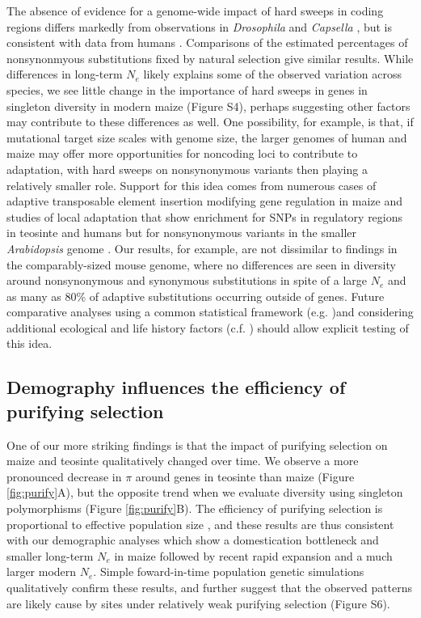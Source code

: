 \documentclass[12pt,a4paper]{article}
\begin{document}
The absence of evidence for a genome-wide impact of hard sweeps in coding regions differs markedly from observations in \emph{Drosophila} \cite{sattath2011} and \emph{Capsella} \cite{williamson2014}, but is consistent with data from humans \cite{hernandez2011}.
Comparisons of the estimated percentages of nonsynonmyous substitutions fixed by natural selection \cite{ross2009,sella2009,eyre2009estimating,williamson2014} give similar results. 
While differences in long-term $N_e$ likely explains some of the observed variation across species, we see little change in the importance of hard sweeps in genes in singleton diversity in modern maize (Figure S4), perhaps suggesting other factors may contribute to these differences as well.  
One possibility, for example, is that, if mutational target size scales with genome size, the larger genomes of human and maize may offer more opportunities for noncoding loci to contribute to adaptation, with hard sweeps on nonsynonymous variants then playing a relatively smaller role. 
Support for this idea comes from numerous cases of adaptive transposable element insertion modifying gene regulation in maize \cite{studer2011,mao2015,yang2013} and studies of local adaptation that show enrichment for SNPs in regulatory regions in teosinte \cite{pyhajarvi2013} and humans \cite{fraser2013gene} but for nonsynonymous variants in the smaller \emph{Arabidopsis} genome \cite{hancock2011adaptation}.  
Our results, for example, are not dissimilar to findings in the comparably-sized mouse genome, where no differences are seen in diversity around nonsynonymous and synonymous substitutions in spite of a large $N_e$ and  as many as 80\% of adaptive substitutions occurring outside of genes\cite{Halligan:2013ir}.
Future comparative analyses using a common statistical framework (e.g. \cite{corbett2015} )and considering additional ecological and life history factors (c.f. \cite{leffler2012}) should allow explicit testing of this idea.

\subsection*{Demography influences the efficiency of purifying selection} 
One of our more striking findings is that the impact of purifying selection on maize and teosinte qualitatively changed over time. 
We observe a more pronounced decrease in $\pi$ around genes in teosinte than maize (Figure \ref{fig:purify}A), but the opposite trend when we evaluate diversity using singleton polymorphisms (Figure \ref{fig:purify}B).
The efficiency of purifying selection is proportional to effective population size \cite{kimura1984}, and these results are thus consistent with our demographic analyses which show a domestication bottleneck and smaller long-term $N_e$ in maize \cite{eyre1998, tenaillon2004, wright2005, ross2009} followed by recent rapid expansion and a much larger modern $N_e$. 
Simple foward-in-time population genetic simulations qualitatively confirm these results, and further suggest that the observed patterns are likely cause by sites under relatively weak purifying selection (Figure S6).
\end{document}
